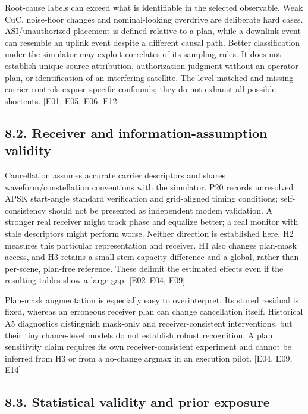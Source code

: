 \documentclass[
  10pt,
]{article}
\begin{document}
Root-cause labels can exceed what is identifiable in the selected
observable. Weak CuC, noise-floor changes and nominal-looking overdrive
are deliberate hard cases. ASI/unauthorized placement is defined
relative to a plan, while a downlink event can resemble an uplink event
despite a different causal path. Better classification under the
simulator may exploit correlates of its sampling rules. It does not
establish unique source attribution, authorization judgment without an
operator plan, or identification of an interfering satellite. The
level-matched and missing-carrier controls expose specific confounds;
they do not exhaust all possible shortcuts. {[}E01, E05, E06, E12{]}

\subsection{8.2. Receiver and information-assumption
validity}\label{receiver-and-information-assumption-validity}

Cancellation assumes accurate carrier descriptors and shares
waveform/constellation conventions with the simulator. P20 records
unresolved APSK start-angle standard verification and grid-aligned
timing conditions; self-consistency should not be presented as
independent modem validation. A stronger real receiver might track phase
and equalize better; a real monitor with stale descriptors might perform
worse. Neither direction is established here. H2 measures this
particular representation and receiver. H1 also changes plan-mask
access, and H3 retains a small stem-capacity difference and a global,
rather than per-scene, plan-free reference. These delimit the estimated
effects even if the resulting tables show a large gap. {[}E02--E04,
E09{]}

Plan-mask augmentation is especially easy to overinterpret. Its stored
residual is fixed, whereas an erroneous receiver plan can change
cancellation itself. Historical A5 diagnostics distinguish mask-only and
receiver-consistent interventions, but their tiny chance-level models do
not establish robust recognition. A plan sensitivity claim requires its
own receiver-consistent experiment and cannot be inferred from H3 or
from a no-change argmax in an execution pilot. {[}E04, E09, E14{]}

\subsection{8.3. Statistical validity and prior
exposure}\label{statistical-validity-and-prior-exposure}
\end{document}
